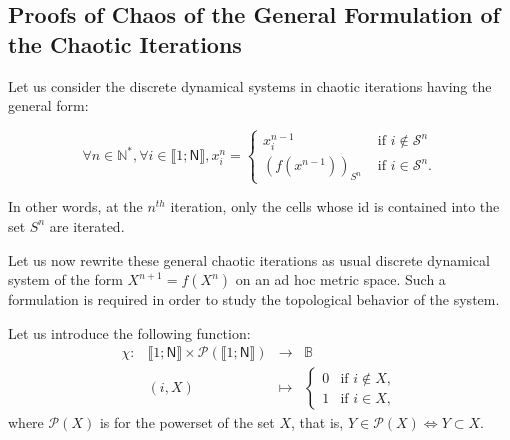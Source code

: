 \documentclass{article}
\begin{document}
\subsection{Proofs of Chaos of the General Formulation of the Chaotic Iterations}
\label{deuxième def}
Let us consider the discrete dynamical systems in chaotic iterations having 
the general form:

\begin{equation}
\forall    n\in     \mathds{N}^{\ast     },    \forall     i\in
\llbracket1;\mathsf{N}\rrbracket ,x_i^n=\left\{
\begin{array}{ll}
  x_i^{n-1} &  \text{ if  } i \notin \mathcal{S}^n \\
  \left(f(x^{n-1})\right)_{S^n} & \text{ if }i \in \mathcal{S}^n.
\end{array}\right.
\label{general CIs}
\end{equation}

In other words, at the $n^{th}$ iteration, only the cells whose id is
contained into the set $S^{n}$ are iterated.

Let us now rewrite these general chaotic iterations as usual discrete dynamical
system of the form $X^{n+1}=f(X^n)$ on an ad hoc metric space. Such a formulation
is required in order to study the topological behavior of the system.

Let us introduce the following function:
\begin{equation}
\begin{array}{cccc}
 \chi: & \llbracket 1; \mathsf{N} \rrbracket \times \mathcal{P}\left(\llbracket 1; \mathsf{N} \rrbracket\right) & \longrightarrow & \mathds{B}\\
         & (i,X) & \longmapsto  & \left\{ \begin{array}{ll} 0 & \textrm{if }i \notin X, \\ 1 & \textrm{if }i \in X,  \end{array}\right.
\end{array} 
\end{equation}
where $\mathcal{P}\left(X\right)$ is for the powerset of the set $X$, that is, $Y \in \mathcal{P}\left(X\right) \Longleftrightarrow Y \subset X$.
\end{document}
